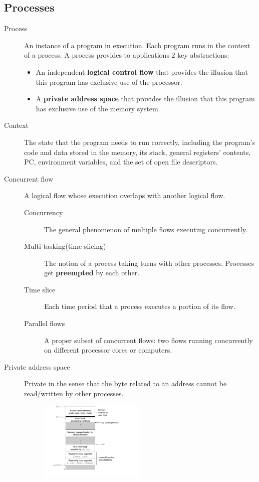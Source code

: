 \subsection{Processes}
\begin{description}
	\item[Process]An instance of a program in execution. Each program runs in the context of a process. A process provides to applications 2 key abstractions:
	\begin{itemize}
		\item An independent \textbf{logical control flow} that provides the illusion that this program has exclusive use of the processor.
		\item A \textbf{private address space} that provides the illusion that this program has exclusive use of the memory system. 
	\end{itemize}
	\item[Context]The state that the program needs to run correctly, including the program's code and data stored in the memory, its stack, general registers' contents, PC, environment variables, and the set of open file descriptors.
	\item[Concurrent flow]A logical flow whose execution overlaps with another logical flow. 
	\begin{description}
		\item[Concurrency]The general phenomenon of multiple flows executing concurrently.
		\item[Multi-tasking(time slicing)]The notion of a process taking turns with other processes. Processes get \textbf{preempted} by each other.
		\item[Time slice]Each time period that a process executes a portion of its flow.
		\item[Parallel flows]A proper subset of concurrent flows: two flows running concurrently on different processor cores or computers.
	\end{description}
	\item[Private address space]Private in the sense that the byte related to an address cannot be read/written by other processes. 
	\begin{figure}[ht]
	\centering
	\includegraphics[width=0.5\textwidth]{addrspace.pdf}

\end{figure}
\end{description}
